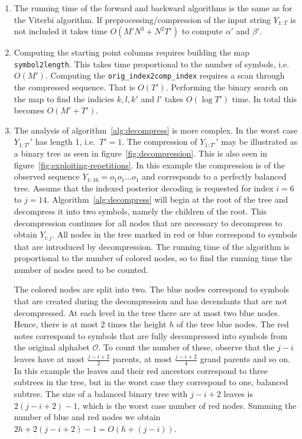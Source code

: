 \begin{enumerate}
\item The running time of the forward and backward algorithms is the same as
  for the Viterbi algorithm. If preprocessing/compression of the input string
  $Y_{1:T}$ is not included it takes time $O\left(M' N^3 + N^2 T'\right)$ to compute
  $\alpha'$ and $\beta'$.

\item Computing the starting point columns requires building the map
  \texttt{symbol2length}. This takes time proportional to the number of
  symbols, i.e.\ $O\left(M'\right)$. Computing the \texttt{orig\_index2comp\_index}
  requires a scan through the compressed sequence. That is $O\left(T'\right)$. Performing
  the binary search on the map to find the indicies $k, l, k'$ and $l'$ takes
  $O\left(\log T'\right)$ time. In total this becomes $O\left(M' + T'\right)$.

\item The analysis of algorithm~\ref{alg:decompress} is more complex. In the
  worst case $Y_{1:T'}'$ has length 1, i.e.\ $T' = 1$. The compression of
  $Y_{1:T'}'$ may be illustrated as a binary tree as seen in
  figure~\ref{fig:decompression}. This is also seen in
  figure~\ref{fig:exploiting-repetitions}. In this example the compression is
  of the observed sequence $Y_{1:16} = o_1o_1\dots{}o_1$ and corresponds to a
  perfectly balanced tree. Assume that the indexed posterior decoding is
  requested for index $i = 6$ to $j = 14$. Algorithm~\ref{alg:decompress} will
  begin at the root of the tree and decompress it into two symbols, namely the
  children of the root. This decompression continues for all nodes that are
  necessary to decompress to obtain $Y_{i:j}$. All nodes in the tree marked in
  red or blue correspond to symbols that are introduced by decompression. The
  running time of the algorithm is proportional to the number of colored nodes,
  so to find the running time the number of nodes need to be counted.

  The colored nodes are split into two. The blue nodes correspond to symbols
  that are created during the decompression and has decendants that are not
  decompressed. At each level in the tree there are at most two blue nodes.
  Hence, there is at most 2 times the height $h$ of the tree blue nodes. The
  red notes correspond to symbols that are fully decompressed into symbols from
  the original alphabet $\mathcal{O}$. To count the number of these, observe
  that the $j - i$ leaves have at most $\frac{j - i + 2}{2}$ parents, at most
  $\frac{j - i + 2}{4}$ grand parents and so on. In this example the leaves and
  their red ancestors correspond to three subtrees in the tree, but in the
  worst case they correspond to one, balanced subtree. The size of a balanced
  binary tree with $j - i + 2$ leaves is $2(j - i + 2) - 1$, which is the worst
  case number of red nodes. Summing the number of blue and red nodes we obtain
  $2h + 2(j - i + 2) - 1 = O\left(h + (j - i)\right)$.


\end{enumerate}
